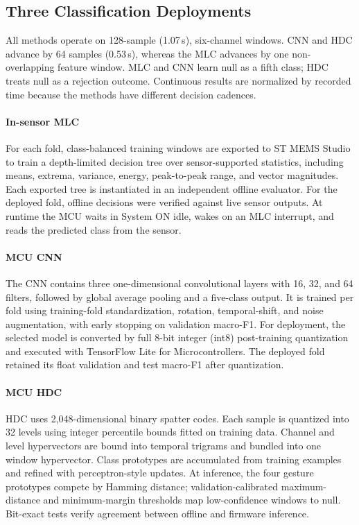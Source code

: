 
\subsection{Three Classification Deployments}

All methods operate on 128-sample (1.07\,s), six-channel windows. CNN and HDC
advance by 64 samples (0.53\,s), whereas the MLC advances by one non-overlapping
feature window. MLC and CNN learn null as a fifth class; HDC treats null as a
rejection outcome. Continuous results are normalized by recorded time because
the methods have different decision cadences.

\paragraph{In-sensor MLC}
For each fold, class-balanced training windows are exported to ST MEMS Studio
to train a depth-limited decision tree over sensor-supported statistics,
including means, extrema, variance, energy, peak-to-peak range, and vector
magnitudes. Each exported tree is instantiated in an independent offline
evaluator. For the deployed fold, offline decisions were verified against live
sensor outputs. At runtime the MCU waits in System ON idle, wakes on an MLC
interrupt, and reads the predicted class from the sensor.

\paragraph{MCU CNN}
The CNN contains three one-dimensional convolutional layers with 16, 32, and
64 filters, followed by global average pooling and a five-class output. It is
trained per fold using training-fold standardization, rotation, temporal-shift,
and noise augmentation, with early stopping on validation macro-F1. For
deployment, the selected model is converted by full 8-bit integer (int8)
post-training quantization and executed with TensorFlow Lite for
Microcontrollers. The deployed fold retained its float validation and test
macro-F1 after quantization.

\paragraph{MCU HDC}
HDC uses 2,048-dimensional binary spatter codes. Each sample is quantized into
32 levels using integer percentile bounds fitted on training data. Channel and
level hypervectors are bound into temporal trigrams and bundled into one window
hypervector. Class prototypes are accumulated from training examples and
refined with perceptron-style updates. At inference, the four gesture
prototypes compete by Hamming distance; validation-calibrated maximum-distance
and minimum-margin thresholds map low-confidence windows to null. Bit-exact
tests verify agreement between offline and firmware inference.

